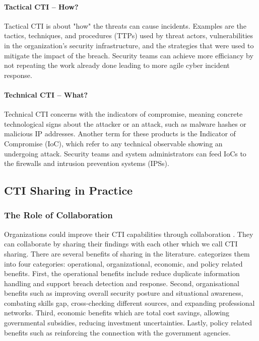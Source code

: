 \paragraph{Tactical CTI -- How?}
Tactical CTI is about "how" the threats can cause incidents. Examples are the tactics, techniques, and procedures (TTPs) used by threat actors, vulnerabilities in the organization's security infrastructure, and the strategies that were used to mitigate the impact of the breach. Security teams can achieve more efficiancy by not repeating the work already done leading to more agile cyber incident response.

\paragraph*{Technical CTI -- What?}
Technical CTI concerns with the indicators of compromise, meaning concrete technological signs about the attacker or an attack, such as malware hashes or malicious IP addresses. Another term for these products is the Indicator of Compromise (IoC), which refer to any technical observable showing an undergoing attack. Security teams and system administrators can feed IoCs to the firewalls and intrusion prevention systems (IPSs).

\subsection{CTI Sharing in Practice}

\subsubsection{The Role of Collaboration}
Organizations could improve their CTI capabilities through collaboration \cite{zibak_cyber_2019}. They can collaborate by sharing their findings with each other which we call CTI sharing. There are several benefits of sharing in the literature. \cite{zibak_cyber_2019} categorizes them into four categories: operational, organizational, economic, and policy related benefits. First, the operational benefits include reduce duplicate information handling and support breach detection and response. Second, organisational benefits such as improving overall security posture and situational awareness, combating skills gap, cross-checking different sources, and expanding professional networks. Third, economic benefits which are total cost savings, allowing governmental subsidies, reducing investment uncertainties. Lastly, policy related benefits such as reinforcing the connection with the government agencies.

